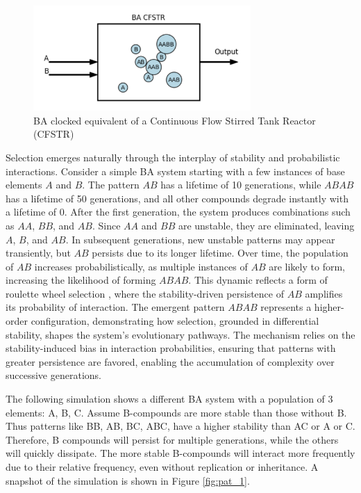 \documentclass[entropy,article,submit,pdftex,moreauthors]{Definitions/mdpi}
\begin{document}
\begin{figure}[htp]
    \centering
    \includegraphics[height=4cm]{ba_cfstr}
    \caption{BA clocked equivalent of a Continuous Flow Stirred Tank Reactor (CFSTR)}
    \label{fig:ba_cfstr}
\end{figure}

Selection emerges naturally through the interplay of stability and probabilistic interactions. Consider a simple BA system starting with a few instances of base elements \( A \) and \( B \). The pattern \( AB \) has a lifetime of 10 generations, while \( ABAB \) has a lifetime of 50 generations, and all other compounds degrade instantly with a lifetime of 0. After the first generation, the system produces combinations such as \( AA \), \( BB \), and \( AB \). Since \( AA \) and \( BB \) are unstable, they are eliminated, leaving \( A \), \( B \), and \( AB \). In subsequent generations, new unstable patterns may appear transiently, but \( AB \) persists due to its longer lifetime. Over time, the population of \( AB \) increases probabilistically, as multiple instances of \( AB \) are likely to form, increasing the likelihood of forming \( ABAB \). This dynamic reflects a form of roulette wheel selection \cite{goldberg1989genetic} \cite{holland1975adaptation}, where the stability-driven persistence of \( AB \) amplifies its probability of interaction. The emergent pattern \( ABAB \) represents a higher-order configuration, demonstrating how selection, grounded in differential stability, shapes the system's evolutionary pathways. The mechanism relies on the stability-induced bias in interaction probabilities, ensuring that patterns with greater persistence are favored, enabling the accumulation of complexity over successive generations.

The following simulation shows a different BA system with a population of 3 elements: {A, B, C}. Assume B-compounds are more stable than those without B. Thus patterns like BB, AB, BC, ABC, have a higher stability than AC or A or C. Therefore, B compounds will persist for multiple generations, while the others will quickly dissipate. The more stable B-compounds will interact more frequently due to their relative frequency, even without replication or inheritance. A snapshot of the simulation is shown in Figure \ref{fig:pat_1}.
\end{document}
